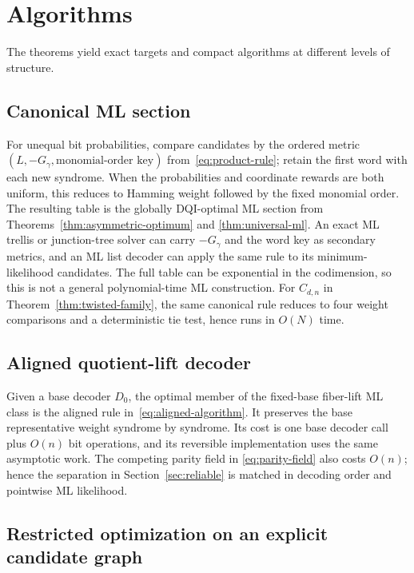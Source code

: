 \documentclass[journal]{IEEEtran}
\theoremstyle{definition}
\theoremstyle{remark}
\begin{document}
\section{Algorithms}
\label{sec:algorithms}

The theorems yield exact targets and compact algorithms at different levels
of structure.

\subsection{Canonical ML section}

For unequal bit probabilities, compare candidates by the ordered metric
$(L,-G_\gamma,\text{monomial-order key})$ from~\eqref{eq:product-rule}; retain
the first word with each new syndrome.  When the probabilities and coordinate
rewards are both uniform, this reduces to Hamming weight followed by the fixed
monomial order.  The resulting table is the
globally DQI-optimal ML section from Theorems~\ref{thm:asymmetric-optimum} and
\ref{thm:universal-ml}.  An exact ML trellis or junction-tree solver can carry
$-G_\gamma$ and the word key as secondary metrics, and an ML list decoder can apply
the same rule to its minimum-likelihood candidates.  The full table can be
exponential in the codimension, so this is not a general polynomial-time ML
construction.  For
$C_{d,n}$ in Theorem~\ref{thm:twisted-family}, the same canonical rule reduces
to four weight comparisons and a deterministic tie test, hence runs in
$O(N)$ time.

\subsection{Aligned quotient-lift decoder}

Given a base decoder $D_0$, the optimal member of the fixed-base fiber-lift ML
class is the aligned rule in~\eqref{eq:aligned-algorithm}.  It preserves the
base representative weight syndrome by syndrome.  Its cost is one base
decoder call plus $O(n)$ bit operations, and its reversible implementation
uses the same asymptotic work.  The competing parity field in
\eqref{eq:parity-field} also costs $O(n)$; hence the separation in
Section~\ref{sec:reliable} is matched in decoding order and pointwise ML
likelihood.

\subsection{Restricted optimization on an explicit candidate graph}
\end{document}
